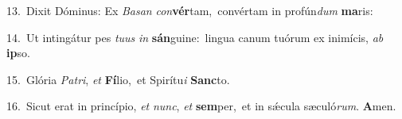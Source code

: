 {\numbfont\textcolor{\numbcolor}{13.}}~Dixit Dóminus: Ex \textit{Ba}\-\textit{san} \textit{con}\-\textbf{vér}tam,~\star convértam in profún\textit{dum} \textbf{ma}\-ris:\par
{\numbfont\textcolor{\numbcolor}{14.}}~Ut intingátur pes \textit{tu}\-\textit{us} \textit{in} \textbf{sán}\-guine:~\star lingua canum tuórum ex inimícis, \textit{ab} \textbf{ip}\-so.\par
{\numbfont\textcolor{\numbcolor}{15.}}~Glória \textit{Pa}\-\textit{tri}, \textit{et} \textbf{Fí}\-lio,~\star et Spirítu\textit{i} \textbf{Sanc}\-to.\par
{\numbfont\textcolor{\numbcolor}{16.}}~Sicut erat in princípio, \textit{et} \textit{nunc}\-, \textit{et} \textbf{sem}\-per,~\star et in sǽcula sæculó\-\textit{rum}\-. \textbf{A}\-men.\par
